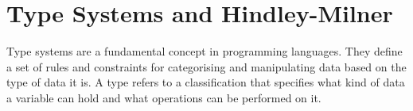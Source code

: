 \documentclass{l4proj}
\begin{document}




\section{Type Systems and Hindley-Milner}



Type systems are a fundamental concept in programming languages.
They define a set of rules and constraints for categorising and manipulating data based on the type of data it is.
A type refers to a classification that specifies what kind of data a variable can hold and what operations can be performed on it.

\end{document}
